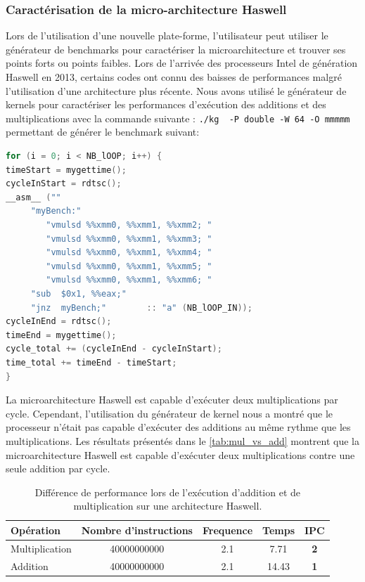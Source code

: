     
    \subsubsection{Caractérisation de la micro-architecture Haswell}
    Lors de l'utilisation d'une nouvelle plate-forme, l'utilisateur peut utiliser le générateur de benchmarks pour caractériser la microarchitecture et trouver ses points forts ou points faibles. Lors de l'arrivée des processeurs Intel de génération Haswell en 2013, certains codes ont connu des baisses de performances malgré l'utilisation d'une architecture plus récente. Nous avons utilisé le générateur de kernels pour caractériser les performances d'exécution des additions et des multiplications avec la commande suivante : \verb|./kg  -P double -W 64 -O mmmmm| permettant de générer le benchmark suivant:
    
    \begin{lstlisting}[label=lst:kg_mul ,language=C]
for (i = 0; i < NB_lOOP; i++) {
timeStart = mygettime();
cycleInStart = rdtsc();
__asm__ ("" 
     "myBench:"  
   		"vmulsd %%xmm0, %%xmm1, %%xmm2; "
   		"vmulsd %%xmm0, %%xmm1, %%xmm3; "
   		"vmulsd %%xmm0, %%xmm1, %%xmm4; "
   		"vmulsd %%xmm0, %%xmm1, %%xmm5; "
   		"vmulsd %%xmm0, %%xmm1, %%xmm6; "
     "sub  $0x1, %%eax;"
     "jnz  myBench;"		:: "a" (NB_lOOP_IN));
cycleInEnd = rdtsc();
timeEnd = mygettime();
cycle_total += (cycleInEnd - cycleInStart);
time_total += timeEnd - timeStart;
}
\end{lstlisting}
    
     La microarchitecture Haswell est capable d'exécuter deux multiplications par cycle. Cependant, l'utilisation du générateur de kernel nous a montré que le processeur n'était pas capable d'exécuter des additions au même rythme que les multiplications. Les résultats présentés dans le \autoref{tab:mul_vs_add} montrent que la microarchitecture Haswell est capable d'exécuter deux multiplications contre une seule addition par cycle.

    \begin{table}[h!]
    \centering
    \begin{tabular}{|l|c|c|c|c|}
        \hline
        Opération & Nombre d'instructions & Frequence & Temps & IPC \\ \hline
        Multiplication & 40000000000 & 2.1 & 7.71 & \textbf{2} \\ \hline
        Addition & 40000000000 & 2.1 & 14.43 & {\color[HTML]{963400} \textbf{1}} \\ \hline
        \end{tabular}%
        
        \caption{Différence de performance lors de l'exécution d'addition et de multiplication sur une architecture Haswell.}
        \label{tab:mul_vs_add}
    \end{table}
    
